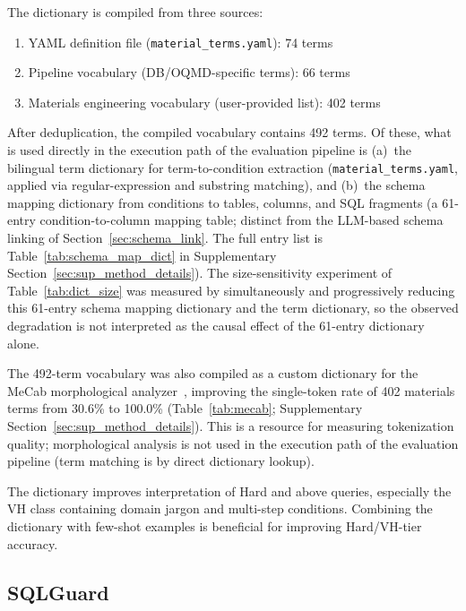 The dictionary is compiled from three sources:
\begin{enumerate}
  \item YAML definition file (\texttt{material\_terms.yaml}): 74 terms
  \item Pipeline vocabulary (DB/OQMD-specific terms): 66 terms
  \item Materials engineering vocabulary (user-provided list): 402 terms
\end{enumerate}
After deduplication, the compiled vocabulary contains 492 terms. Of these, what is used directly in the execution path of the evaluation pipeline is (a)~the bilingual term dictionary for term-to-condition extraction (\texttt{material\_terms.yaml}, applied via regular-expression and substring matching), and (b)~the schema mapping dictionary from conditions to tables, columns, and SQL fragments (a 61-entry condition-to-column mapping table; distinct from the LLM-based schema linking of Section~\ref{sec:schema_link}. The full entry list is Table~\ref{tab:schema_map_dict} in Supplementary Section~\ref{sec:sup_method_details}). The size-sensitivity experiment of Table~\ref{tab:dict_size} was measured by simultaneously and progressively reducing this 61-entry schema mapping dictionary and the term dictionary, so the observed degradation is not interpreted as the causal effect of the 61-entry dictionary alone.

The 492-term vocabulary was also compiled as a custom dictionary for the MeCab morphological analyzer~\cite{kudo2004mecab}, improving the single-token rate of 402 materials terms from 30.6\% to 100.0\% (Table~\ref{tab:mecab}; Supplementary Section~\ref{sec:sup_method_details}). This is a resource for measuring tokenization quality; morphological analysis is not used in the execution path of the evaluation pipeline (term matching is by direct dictionary lookup).

The dictionary improves interpretation of Hard and above queries, especially the VH class containing domain jargon and multi-step conditions. Combining the dictionary with few-shot examples is beneficial for improving Hard/VH-tier accuracy.
\subsection{SQLGuard}
\label{sec:sqlguard}

